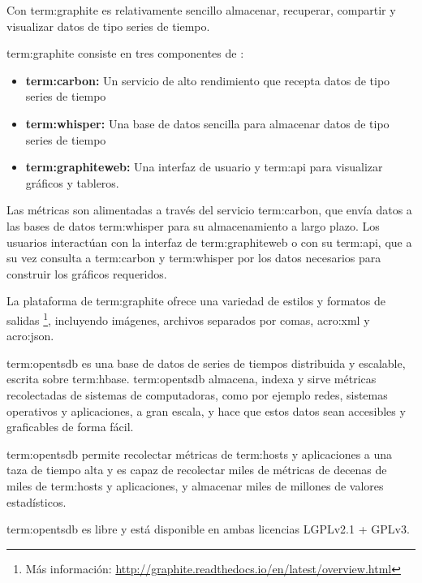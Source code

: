 Con \gls{term:graphite} es relativamente sencillo almacenar, recuperar,
compartir y visualizar datos de tipo series de tiempo.

\gls{term:graphite} consiste en tres componentes de :

\begin{itemize}

  \item \textbf{\gls{term:carbon}:}
  Un servicio de alto rendimiento que recepta datos de tipo series de tiempo

  \item \textbf{\gls{term:whisper}:}
  Una base de datos sencilla para almacenar datos de tipo series de tiempo

  \item \textbf{\gls{term:graphiteweb}:}
  Una interfaz de usuario y \gls{term:api} para visualizar gráficos y tableros.

\end{itemize}

Las métricas son alimentadas a través del servicio \gls{term:carbon}, que envía
datos a las bases de datos \gls{term:whisper} para su almacenamiento a largo
plazo. Los usuarios interactúan con la interfaz de \gls{term:graphiteweb} o con
su \gls{term:api}, que a su vez consulta a \gls{term:carbon} y
\gls{term:whisper} por los datos necesarios para construir los gráficos
requeridos.


La plataforma  de \gls{term:graphite} ofrece una variedad de estilos y
formatos de salidas \footnote{Más información:
\url{http://graphite.readthedocs.io/en/latest/overview.html}},
incluyendo imágenes, archivos separados por comas, \gls{acro:xml} y
\gls{acro:json}.

\gls{term:opentsdb} es una base de datos de series de tiempos distribuida y
escalable, escrita sobre \gls{term:hbase}. \gls{term:opentsdb} almacena, indexa
y sirve métricas recolectadas de sistemas de computadoras, como por ejemplo
redes, sistemas operativos y aplicaciones, a gran escala, y hace que estos
datos sean accesibles y graficables de forma fácil.

\gls{term:opentsdb} permite recolectar métricas de \glspl{term:host} y
aplicaciones a una taza de tiempo alta y es capaz de recolectar miles de
métricas de decenas de miles de \glspl{term:host} y aplicaciones, y almacenar
miles de millones de valores estadísticos.

\gls{term:opentsdb} es  libre y está disponible en ambas licencias
LGPLv2.1 + GPLv3. \cite{opentsdb}

